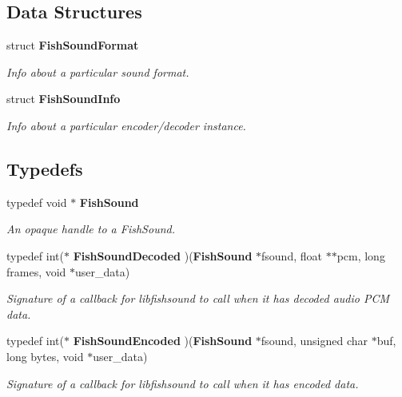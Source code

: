 \subsection*{Data Structures}
\begin{CompactItemize}
\item 
struct {\bf Fish\-Sound\-Format}
\begin{CompactList}\small\item\em Info about a particular sound format. \item\end{CompactList}\item 
struct {\bf Fish\-Sound\-Info}
\begin{CompactList}\small\item\em Info about a particular encoder/decoder instance. \item\end{CompactList}\end{CompactItemize}
\subsection*{Typedefs}
\begin{CompactItemize}
\item 
typedef void $\ast$ {\bf Fish\-Sound}
\begin{CompactList}\small\item\em An opaque handle to a Fish\-Sound. \item\end{CompactList}\item 
typedef int($\ast$ {\bf Fish\-Sound\-Decoded} )({\bf Fish\-Sound} $\ast$fsound, float $\ast$$\ast$pcm, long frames, void $\ast$user\_\-data)
\begin{CompactList}\small\item\em Signature of a callback for libfishsound to call when it has decoded audio PCM data. \item\end{CompactList}\item 
typedef int($\ast$ {\bf Fish\-Sound\-Encoded} )({\bf Fish\-Sound} $\ast$fsound, unsigned char $\ast$buf, long bytes, void $\ast$user\_\-data)
\begin{CompactList}\small\item\em Signature of a callback for libfishsound to call when it has encoded data. \item\end{CompactList}\end{CompactItemize}
